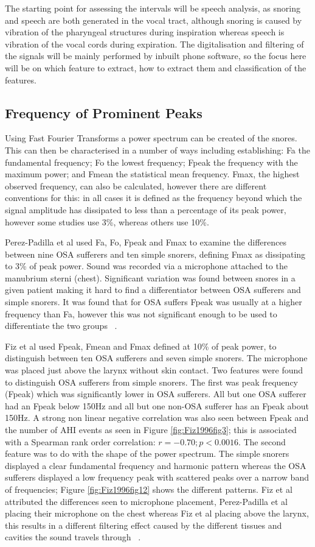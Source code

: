 The starting point for assessing the intervals will be speech analysis, as snoring and speech are both generated in the vocal tract, although snoring is caused by vibration of the pharyngeal structures during inspiration whereas speech is vibration of the vocal cords during expiration. The digitalisation and filtering of the signals will be mainly performed by inbuilt phone software, so the focus here will be on which feature to extract, how to extract them and classification of the features. 

\subsection{Frequency of Prominent Peaks}
Using Fast Fourier Transforms a power spectrum can be created of the snores. This can then be characterised in a number of ways including establishing: Fa the fundamental frequency; Fo the lowest frequency; Fpeak the frequency with the maximum power; and Fmean the statistical mean frequency. Fmax, the highest observed frequency, can also be calculated, however there are different conventions for this: in all cases it is defined as the frequency beyond which the signal amplitude has dissipated to less than a percentage of its peak power, however some studies use 3\%, whereas others use 10\%. 

Perez-Padilla et al used Fa, Fo, Fpeak and Fmax to examine the differences between nine OSA sufferers and ten simple snorers, defining Fmax as dissipating to 3\% of peak power. Sound was recorded via a microphone attached to the manubrium sterni (chest). Significant variation was found between snores in a given patient making it hard to find a differentiator between OSA sufferers and simple snorers. It was found that for OSA suffers Fpeak was usually at a higher frequency than Fa, however this was not significant enough to be used to differentiate the two groups ~\cite{whitelaw1993characteristics}.

Fiz et al used Fpeak, Fmean and Fmax defined at 10\% of peak power, to distinguish between ten OSA sufferers and seven simple snorers. The microphone was placed just above the larynx without skin contact. Two features were found to distinguish OSA sufferers from simple snorers. The first was peak frequency (Fpeak) which was significantly lower in OSA sufferers. All but one OSA sufferer had an Fpeak below 150Hz and all but one non-OSA sufferer has an Fpeak about 150Hz. A strong non linear negative correlation was also seen between Fpeak and the number of AHI events as seen in Figure \ref{fig:Fiz1996fig3}; this is associated with a Spearman rank order correlation: $r=-0.70; p<0.0016$. The second feature was to do with the shape of the power spectrum. The simple snorers displayed a clear fundamental frequency and harmonic pattern whereas the OSA sufferers displayed a low frequency peak with scattered peaks over a narrow band of frequencies; Figure \ref{fig:Fiz1996fig12} shows the different patterns. Fiz et al attributed the differences seen to microphone placement, Perez-Padilla et al placing their microphone on the chest whereas Fiz et al placing above the larynx, this results in a different filtering effect caused by the different tissues and cavities the sound travels through ~\cite{fiz1996acoustic}.


